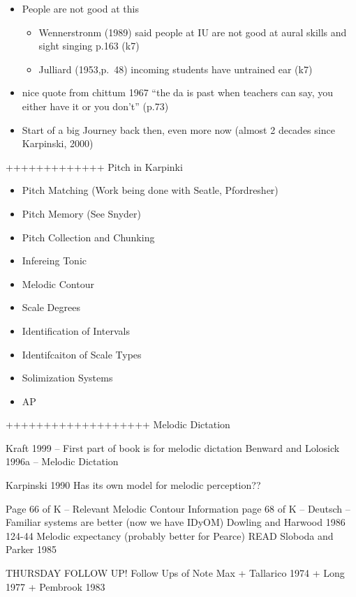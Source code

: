 \documentclass[]{book}
\providecommand{\tightlist}{%
  \setlength{\itemsep}{0pt}\setlength{\parskip}{0pt}}
\theoremstyle{definition}
\theoremstyle{definition}
\theoremstyle{definition}
\theoremstyle{remark}
\begin{document}
\begin{itemize}
\tightlist
\item
  People are not good at this

  \begin{itemize}
  \tightlist
  \item
    Wennerstronm (1989) said people at IU are not good at aural skills
    and sight singing p.163 (k7)
  \item
    Julliard (1953,p.~48) incoming students have untrained ear (k7)
  \end{itemize}
\item
  nice quote from chittum 1967 ``the da is past when teachers can say,
  you either have it or you don't'' (p.73)
\item
  Start of a big Journey back then, even more now (almost 2 decades
  since Karpinski, 2000)
\end{itemize}

+++++++++++++ Pitch in Karpinki

\begin{itemize}
\tightlist
\item
  Pitch Matching (Work being done with Seatle, Pfordresher)
\item
  Pitch Memory (See Snyder)
\item
  Pitch Collection and Chunking
\item
  Infereing Tonic
\item
  Melodic Contour
\item
  Scale Degrees
\item
  Identification of Intervals
\item
  Identifcaiton of Scale Types
\item
  Solimization Systems
\item
  AP
\end{itemize}

+++++++++++++++++++ Melodic Dictation

Kraft 1999 -- First part of book is for melodic dictation Benward and
Lolosick 1996a -- Melodic Dictation

Karpinski 1990 Has its own model for melodic perception??

Page 66 of K -- Relevant Melodic Contour Information page 68 of K --
Deutsch -- Familiar systems are better (now we have IDyOM) Dowling and
Harwood 1986 124-44 Melodic expectancy (probably better for Pearce) READ
Sloboda and Parker 1985

THURSDAY FOLLOW UP! Follow Ups of Note Max + Tallarico 1974 + Long 1977
+ Pembrook 1983
\end{document}
